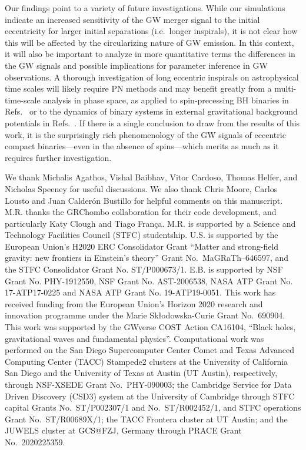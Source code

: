 \documentclass[floats,floatfix,showpacs,amssymb,physrev,twocolumn,superscriptaddress,reprint,
nofootinbib, longbibliography]{revtex4-2}
\begin{document}
%
Our findings point to a variety of future investigations. While our
simulations indicate an increased sensitivity of the GW merger signal
to the initial eccentricity for larger initial separations
(i.e.~longer inspirals), it is not clear how this will be affected by
the circularizing nature of GW emission. In this context, it will also
be important to analyze in more quantitative terms the differences in
the GW signals and possible implications for parameter inference in GW
observations. A thorough investigation of long eccentric inspirals on
astrophysical time scales will likely require PN methods and may
benefit greatly from a multi-time-scale analysis in phase space, as
applied to spin-precessing BH binaries in
Refs.~\cite{Kesden:2014sla,Gerosa:2015tea} or to the dynamics of
binary systems in external gravitational background potentials in
Refs.~\cite{Hamilton:2019a,Hamilton:2019b}. If there is a single
conclusion to draw from the results of this work, it is the
surprisingly rich phenomenology of the GW signals of eccentric compact
binaries---even in the absence of spins---which merits as much as it
requires further investigation.

\begin{acknowledgments}
%
We thank Michalis Agathos, Vishal Baibhav, Vitor Cardoso, Thomas
Helfer, and Nicholas Speeney for useful discussions. 
We also thank Chris Moore, Carlos Lousto and Juan Calder\'on 
Bustillo for helpful comments on this manuscript.
M.R. thanks the
GRChombo collaboration \cite{GRChomboWebsite} for their code
development, and particularly Katy Clough and Tiago Fran\c{c}a. M.R. is
supported by a Science and Technology Facilities Council (STFC)
studentship. U.S. is supported by the European Union’s H2020 ERC
Consolidator Grant ``Matter and strong-field gravity: new frontiers in
Einstein's theory'' Grant No.~MaGRaTh--646597, and the STFC
Consolidator Grant No. ST/P000673/1. E.B. is supported by NSF Grant
No. PHY-1912550, NSF Grant No. AST-2006538, NASA ATP Grant No.
17-ATP17-0225 and NASA ATP Grant No. 19-ATP19-0051. This work has
received funding from the European Union's Horizon 2020 research and
innovation programme under the Marie Sk\l odowska-Curie Grant
No.~690904. This work was supported by the GWverse COST Action
CA16104, ``Black holes, gravitational waves and fundamental physics''.
%
Computational work was performed on
the San Diego Supercomputer Center Comet and Texas Advanced Computing 
Center (TACC) Stampede2 clusters at the University of California San Diego 
and the University of Texas at Austin (UT Austin), respectively, through
NSF-XSEDE Grant No.~PHY-090003; the Cambridge Service for Data 
Driven Discovery (CSD3) system at the University of Cambridge 
through STFC capital Grants No.~ST/P002307/1 and No.~ST/R002452/1,
and STFC operations Grant No.~ST/R00689X/1;
the TACC Frontera cluster at UT Austin; and
the JUWELS cluster at GCS@FZJ, Germany through PRACE Grant No.~2020225359.

\end{acknowledgments}
\appendix
\end{document}
